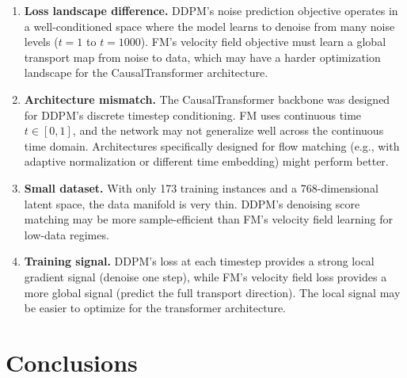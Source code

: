 \documentclass[11pt,letterpaper]{article}
\begin{document}
\begin{enumerate}
    \item \textbf{Loss landscape difference.} DDPM's noise prediction objective operates in a well-conditioned space where the model learns to denoise from many noise levels ($t=1$ to $t=1000$). FM's velocity field objective must learn a global transport map from noise to data, which may have a harder optimization landscape for the CausalTransformer architecture.

    \item \textbf{Architecture mismatch.} The CausalTransformer backbone was designed for DDPM's discrete timestep conditioning. FM uses continuous time $t \in [0,1]$, and the network may not generalize well across the continuous time domain. Architectures specifically designed for flow matching (e.g., with adaptive normalization or different time embedding) might perform better.

    \item \textbf{Small dataset.} With only 173 training instances and a 768-dimensional latent space, the data manifold is very thin. DDPM's denoising score matching may be more sample-efficient than FM's velocity field learning for low-data regimes.

    \item \textbf{Training signal.} DDPM's loss at each timestep provides a strong local gradient signal (denoise one step), while FM's velocity field loss provides a more global signal (predict the full transport direction). The local signal may be easier to optimize for the transformer architecture.
\end{enumerate}

\section{Conclusions}
\end{document}
